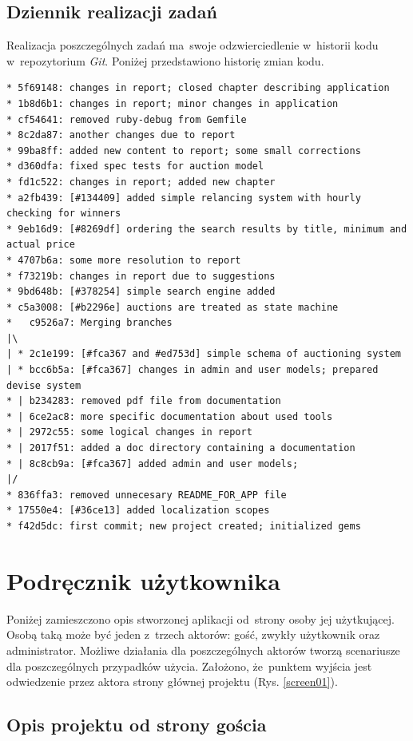 \subsection{Dziennik realizacji zadań}

Realizacja poszczególnych zadań ma~swoje odzwierciedlenie w~historii kodu w~repozytorium \textit{Git}. Poniżej przedstawiono historię zmian kodu.

\begin{verbatim}
* 5f69148: changes in report; closed chapter describing application
* 1b8d6b1: changes in report; minor changes in application
* cf54641: removed ruby-debug from Gemfile
* 8c2da87: another changes due to report
* 99ba8ff: added new content to report; some small corrections
* d360dfa: fixed spec tests for auction model
* fd1c522: changes in report; added new chapter
* a2fb439: [#134409] added simple relancing system with hourly checking for winners
* 9eb16d9: [#8269df] ordering the search results by title, minimum and actual price
* 4707b6a: some more resolution to report
* f73219b: changes in report due to suggestions
* 9bd648b: [#378254] simple search engine added
* c5a3008: [#b2296e] auctions are treated as state machine
*   c9526a7: Merging branches
|\
| * 2c1e199: [#fca367 and #ed753d] simple schema of auctioning system
| * bcc6b5a: [#fca367] changes in admin and user models; prepared devise system
* | b234283: removed pdf file from documentation
* | 6ce2ac8: more specific documentation about used tools
* | 2972c55: some logical changes in report
* | 2017f51: added a doc directory containing a documentation
* | 8c8cb9a: [#fca367] added admin and user models;
|/
* 836ffa3: removed unnecesary README_FOR_APP file
* 17550e4: [#36ce13] added localization scopes
* f42d5dc: first commit; new project created; initialized gems
\end{verbatim}

\section{Podręcznik użytkownika}

Poniżej zamieszczono opis stworzonej aplikacji od~strony osoby jej użytkującej. Osobą taką może być jeden z~trzech aktorów: gość, zwykły użytkownik oraz administrator. Możliwe działania dla poszczególnych aktorów tworzą scenariusze dla poszczególnych przypadków użycia. Założono, że~punktem wyjścia jest odwiedzenie przez aktora strony głównej projektu (Rys. \ref{screen01}).

\subsection{Opis projektu od strony gościa}

